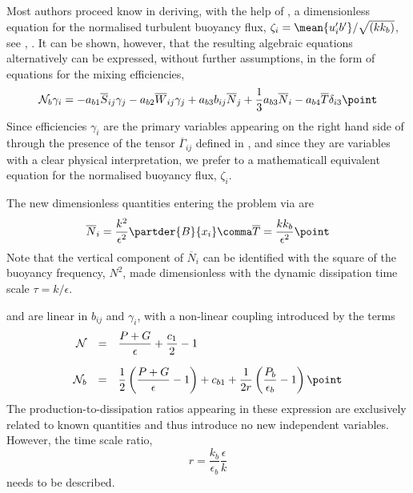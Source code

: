 Most authors proceed know in deriving, with the help of , a
dimensionless equation for the normalised turbulent buoyancy flux,
$\zeta_i = \mean{u'_i b'} / \sqrt{(k k_b)}$, see \cite{Soetal2002a},
\cite{Jinetal2003}. It can be shown, however, that the resulting
algebraic equations alternatively can be expressed, without further
assumptions, in the form of equations for the mixing efficiencies,
\begin{equation}
  \label{gammaASM}
  {\cal N}_b \gamma_{i} = 
  - a_{b 1} \overline{S}_{ij} \gamma_j 
  - a_{b 2} \overline{W}_{ij} \gamma_j 
  + a_{b 3} b_{ij} \overline{N}_{j}  + \dfrac{1}{3} a_{b 3} \overline{N}_{i} 
  - a_{b 4} \overline{T} \delta_{i3}
  \point 
\end{equation}
Since efficiencies $\gamma_i$ are the primary variables appearing on
the right hand side of  through the presence of the tensor
$\overline{\Gamma}_{ij}$ defined in , and since they are
variables with a clear physical interpretation, we prefer
 to a mathematicall equivalent equation for the
normalised buoyancy flux, $\zeta_i$.

The new dimensionless quantities entering the problem via  are 
\begin{equation}
  \label{Nbar}
  \overline{N}_i =  \dfrac{k^2}{\epsilon^2} \partder{B}{x_i} \comma
  \overline{T}   =  \dfrac{k k_b}{\epsilon^2}
  \point
\end{equation}
Note that the vertical component of $\overline{N}_i$ can be identified with
the square of the buoyancy frequency, $N^2$, made dimensionless with the dynamic 
dissipation time scale $\tau=k/\epsilon$.

 and  are linear in $b_{ij}$ and $\gamma_i$, with a non-linear
coupling introduced by the terms
\begin{equation}
  \label{NandNb}
  \begin{array}{rcl}
    {\cal N} &=&   \dfrac{P+G}{\epsilon} + \dfrac{c_1}{2} - 1                \\[5mm] 
    {\cal N}_b &=& \dfrac{1}{2} \left( \dfrac{P+G}{\epsilon}   - 1  \right) 
    + c_{b 1} + \dfrac{1}{2r}   \left( \dfrac{P_b}{\epsilon_b} -1   \right)
   \point
  \end{array}
\end{equation}
The production-to-dissipation ratios appearing in these expression are
exclusively related to known quantities and thus introduce no new
independent variables. However, the time scale ratio,
\begin{equation}
 \label{DefR}
  r = \dfrac{k_b}{\epsilon_b} \dfrac{\epsilon}{k}
\end{equation}
needs to be described. 

